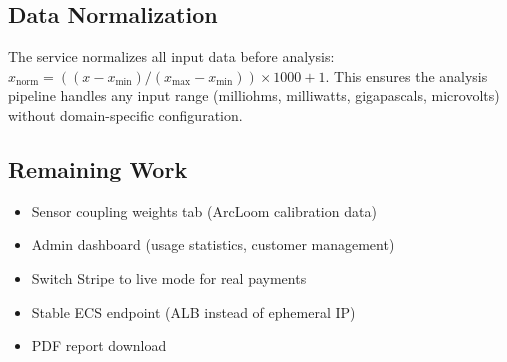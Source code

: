 \documentclass[11pt,letterpaper]{article}
\begin{document}
\subsection{Data Normalization}

The service normalizes all input data before analysis:
$x_{\text{norm}} = ((x - x_{\min}) / (x_{\max} - x_{\min}))
\times 1000 + 1$. This ensures the analysis pipeline handles
any input range (milliohms, milliwatts, gigapascals, microvolts)
without domain-specific configuration.

\subsection{Remaining Work}

\begin{itemize}
  \item Sensor coupling weights tab (ArcLoom calibration data)
  \item Admin dashboard (usage statistics, customer management)
  \item Switch Stripe to live mode for real payments
  \item Stable ECS endpoint (ALB instead of ephemeral IP)
  \item PDF report download
\end{itemize}
\end{document}
